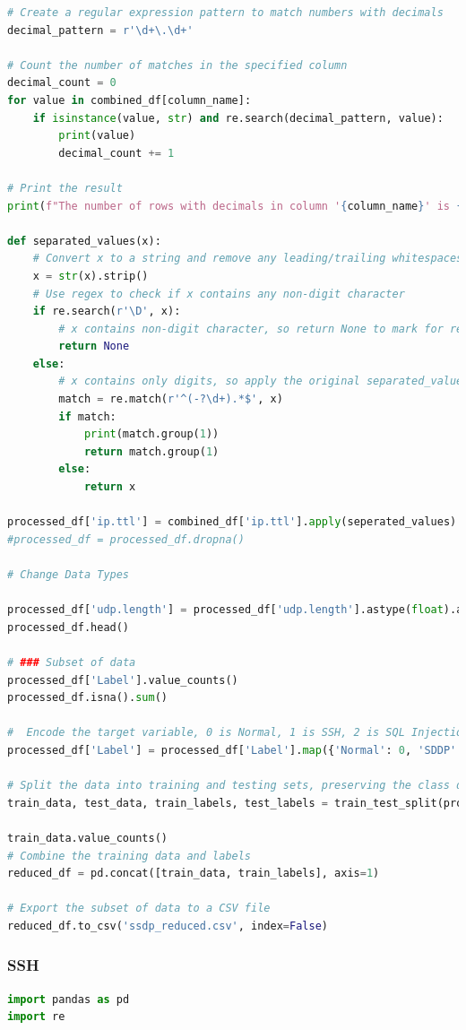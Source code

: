 \begin{appendices}
\begin{lstlisting}[language=Python]
# Create a regular expression pattern to match numbers with decimals
decimal_pattern = r'\d+\.\d+'

# Count the number of matches in the specified column
decimal_count = 0
for value in combined_df[column_name]:
    if isinstance(value, str) and re.search(decimal_pattern, value):
        print(value)
        decimal_count += 1

# Print the result
print(f"The number of rows with decimals in column '{column_name}' is {decimal_count}.")

def separated_values(x):
    # Convert x to a string and remove any leading/trailing whitespaces
    x = str(x).strip()
    # Use regex to check if x contains any non-digit character
    if re.search(r'\D', x):
        # x contains non-digit character, so return None to mark for removal
        return None
    else:
        # x contains only digits, so apply the original separated_values logic
        match = re.match(r'^(-?\d+).*$', x)
        if match:
            print(match.group(1))
            return match.group(1)
        else:
            return x

processed_df['ip.ttl'] = combined_df['ip.ttl'].apply(seperated_values)
#processed_df = processed_df.dropna()

# Change Data Types

processed_df['udp.length'] = processed_df['udp.length'].astype(float).astype(int)
processed_df.head()

# ### Subset of data
processed_df['Label'].value_counts()
processed_df.isna().sum()

#  Encode the target variable, 0 is Normal, 1 is SSH, 2 is SQL Injection
processed_df['Label'] = processed_df['Label'].map({'Normal': 0, 'SDDP': 1})

# Split the data into training and testing sets, preserving the class distribution
train_data, test_data, train_labels, test_labels = train_test_split(processed_df.drop('Label', axis=1), processed_df['Label'], test_size=0.5, stratify=processed_df['Label'])

train_data.value_counts()
# Combine the training data and labels
reduced_df = pd.concat([train_data, train_labels], axis=1)

# Export the subset of data to a CSV file
reduced_df.to_csv('ssdp_reduced.csv', index=False)	
\end{lstlisting}

\subsubsection*{SSH}
\begin{lstlisting}[language=Python]
import pandas as pd
import re


\end{lstlisting}
\end{appendices}
